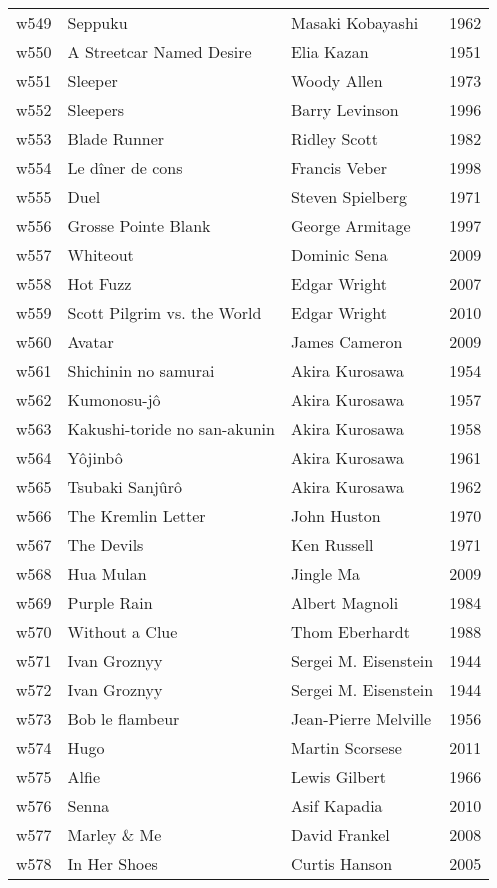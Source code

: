 \documentclass{article}
\begin{document}
\begin {center}
\begin{longtable}{l p{10cm} l l}
w549 & Seppuku & Masaki Kobayashi & 1962 \\
w550 & A Streetcar Named Desire & Elia Kazan & 1951 \\
w551 & Sleeper & Woody Allen & 1973 \\
w552 & Sleepers & Barry Levinson & 1996 \\
w553 & Blade Runner & Ridley Scott & 1982 \\
w554 & Le dîner de cons & Francis Veber & 1998 \\
w555 & Duel & Steven Spielberg & 1971 \\
w556 & Grosse Pointe Blank & George Armitage & 1997 \\
w557 & Whiteout & Dominic Sena & 2009 \\
w558 & Hot Fuzz & Edgar Wright & 2007 \\
w559 & Scott Pilgrim vs. the World & Edgar Wright & 2010 \\
w560 & Avatar & James Cameron & 2009 \\
w561 & Shichinin no samurai & Akira Kurosawa & 1954 \\
w562 & Kumonosu-jô & Akira Kurosawa & 1957 \\
w563 & Kakushi-toride no san-akunin & Akira Kurosawa & 1958 \\
w564 & Yôjinbô & Akira Kurosawa & 1961 \\
w565 & Tsubaki Sanjûrô & Akira Kurosawa & 1962 \\
w566 & The Kremlin Letter & John Huston & 1970 \\
w567 & The Devils & Ken Russell & 1971 \\
w568 & Hua Mulan & Jingle Ma & 2009 \\
w569 & Purple Rain & Albert Magnoli & 1984 \\
w570 & Without a Clue & Thom Eberhardt & 1988 \\
w571 & Ivan Groznyy & Sergei M. Eisenstein & 1944 \\
w572 & Ivan Groznyy & Sergei M. Eisenstein & 1944 \\
w573 & Bob le flambeur & Jean-Pierre Melville & 1956 \\
w574 & Hugo & Martin Scorsese & 2011 \\
w575 & Alfie & Lewis Gilbert & 1966 \\
w576 & Senna & Asif Kapadia & 2010 \\
w577 & Marley \& Me & David Frankel & 2008 \\
w578 & In Her Shoes & Curtis Hanson & 2005 \\

\end{longtable}
\end{center}
\end{document}
